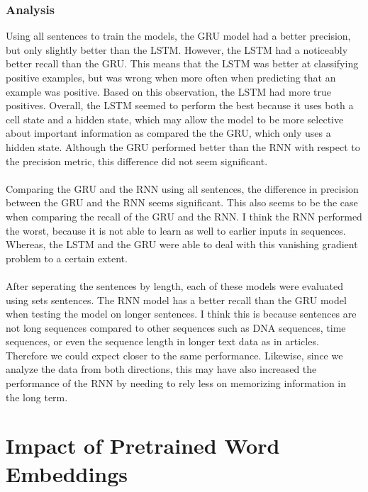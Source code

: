 \documentclass[12pt]{article}
\begin{document}
\subsubsection{Analysis}
Using all sentences to train the models, the GRU model had a better precision, but only slightly better than the LSTM. However, the LSTM had a noticeably better recall than the GRU. This means that the LSTM was better at classifying positive examples, but was wrong when more often when predicting that an example was positive. Based on this observation, the LSTM had more true positives. Overall, the LSTM seemed to perform the best because it uses both a cell state and a hidden state, which may allow the model to be more selective about important information as compared the the GRU, which only uses a hidden state.  Although the GRU performed better than the RNN with respect to the precision metric, this difference did not seem significant.\\
\\
Comparing the GRU and the RNN using all sentences, the difference in precision between the GRU and the RNN seems significant. This also seems to be the case when comparing the recall of the GRU and the RNN. I think the RNN performed the worst, because it is not able to learn as well to earlier inputs in sequences. Whereas, the LSTM and the GRU were able to deal with this vanishing gradient problem to a certain extent.\\
\\
After seperating the sentences by length, each of these models were evaluated using sets sentences. The RNN model has a better recall than the GRU model when testing the model on longer sentences. I think this is because sentences are not long sequences compared to other sequences such as DNA sequences, time sequences, or even the sequence length in longer text data as in articles. Therefore we could expect closer to the same performance. Likewise, since we analyze the data from both directions, this may have also increased the performance of the RNN by needing to rely less on memorizing information in the long term.



\section{Impact of Pretrained Word Embeddings}
\end{document}
